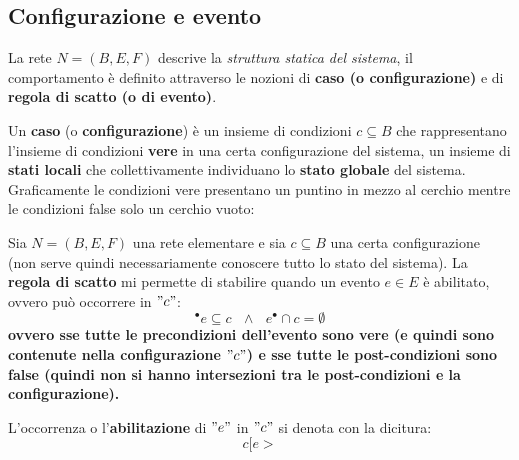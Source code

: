 \subsection{Configurazione e evento}
La rete $N=(B, E, F)$ descrive la \textit{struttura statica del sistema}, il
comportamento è definito attraverso le nozioni di \textbf{caso (o
  configurazione)} e di \textbf{regola di scatto (o di evento)}.\\
\begin{definizione}
  Un \textbf{caso} (o \textbf{configurazione}) è un insieme di condizioni
  $c\subseteq B$ che rappresentano l’insieme di condizioni \textbf{vere} in una certa
  configurazione del sistema, un insieme di \textbf{stati locali} che
  collettivamente individuano lo \textbf{stato globale} del sistema.\\
  Graficamente le condizioni vere presentano un puntino in mezzo al cerchio
  mentre le condizioni false solo un cerchio vuoto:
  \begin{center}
  \end{center}
\end{definizione} \vspace{5mm} %
\begin{definizione}
  Sia $N=(B, E, F)$ una rete elementare e sia $c\subseteq B$ una certa
  configurazione (non serve quindi necessariamente conoscere tutto lo stato del
  sistema). La \textbf{regola di scatto} mi permette di stabilire quando
  un evento $e\in E$ è abilitato, ovvero può occorrere in $"c"$:
  \[^\bullet e\subseteq c \,\,\,\,\land\,\,\,\, e^\bullet \cap c = \emptyset\]
  \textbf{ovvero sse tutte le precondizioni dell'evento sono vere (e quindi sono
  contenute nella configurazione $"c"$) e sse tutte le post-condizioni sono false
  (quindi non si hanno intersezioni tra le post-condizioni e la
  configurazione).} \\
\end{definizione} \vspace{5mm} %
\begin{nota}
  
  L'occorrenza o l'\textbf{abilitazione} di $"e"$ in $"c"$ si denota con la dicitura:
  \[c[e >\]
  \end{nota}
